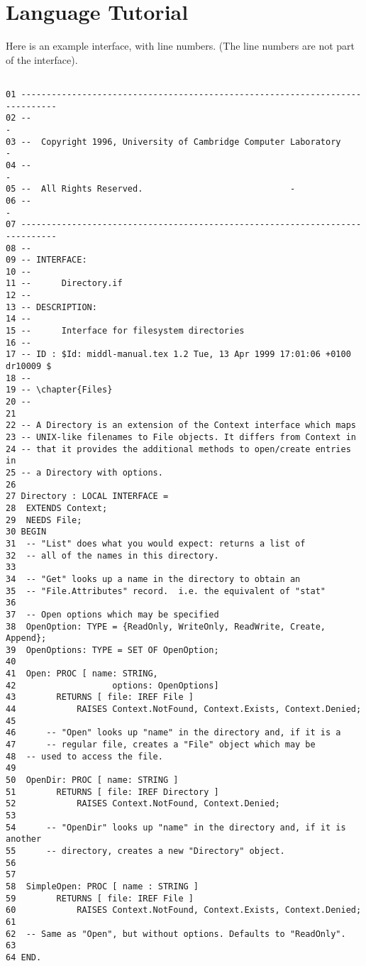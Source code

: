 \chapter{Language Tutorial}

Here is an example \MIDDL{} interface, with line numbers. (The line
numbers are not part of the interface).

\begin{verbatim}

01 -----------------------------------------------------------------------------
02 --                                                                          -
03 --  Copyright 1996, University of Cambridge Computer Laboratory             -
04 --                                                                          -
05 --  All Rights Reserved.					            -
06 --                                                                          -
07 -----------------------------------------------------------------------------
08 --
09 -- INTERFACE:
10 --
11 --      Directory.if
12 -- 
13 -- DESCRIPTION:
14 --
15 --      Interface for filesystem directories
16 -- 
17 -- ID : $Id: middl-manual.tex 1.2 Tue, 13 Apr 1999 17:01:06 +0100 dr10009 $
18 -- 
19 -- \chapter{Files}
20 --
21 
22 -- A Directory is an extension of the Context interface which maps
23 -- UNIX-like filenames to File objects. It differs from Context in
24 -- that it provides the additional methods to open/create entries in
25 -- a Directory with options. 
26 
27 Directory : LOCAL INTERFACE =
28  EXTENDS Context;
29  NEEDS File;
30 BEGIN
31	-- "List" does what you would expect: returns a list of
32	-- all of the names in this directory.
33
34	-- "Get" looks up a name in the directory to obtain an
35	-- "File.Attributes" record.  i.e. the equivalent of "stat"
36
37	-- Open options which may be specified
38	OpenOption: TYPE = {ReadOnly, WriteOnly, ReadWrite, Create, Append};
39	OpenOptions: TYPE = SET OF OpenOption;
40
41	Open: PROC [ name: STRING,
42                   options: OpenOptions]
43	      RETURNS [ file: IREF File ]
44            RAISES Context.NotFound, Context.Exists, Context.Denied;
45
46      -- "Open" looks up "name" in the directory and, if it is a 
47      -- regular file, creates a "File" object which may be 
48	-- used to access the file.
49
50	OpenDir: PROC [ name: STRING ]
51	      RETURNS [ file: IREF Directory ]
52            RAISES Context.NotFound, Context.Denied;
53
54      -- "OpenDir" looks up "name" in the directory and, if it is another 
55      -- directory, creates a new "Directory" object.
56
57
58	SimpleOpen: PROC [ name : STRING ]
59	      RETURNS [ file: IREF File ]
60            RAISES Context.NotFound, Context.Exists, Context.Denied;
61
62	-- Same as "Open", but without options. Defaults to "ReadOnly".
63
64 END.
\end{verbatim}

